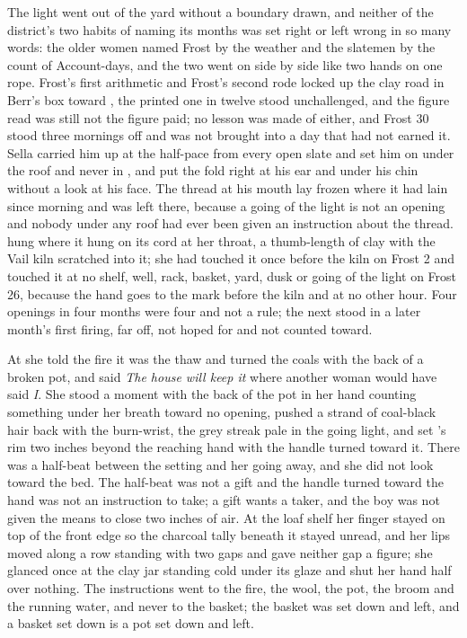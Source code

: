 The light went out of the yard without a boundary drawn, and neither of the district's two habits of naming its months was set right or left wrong in so many words: the older women named Frost by the weather and the slatemen by the count of Account-days, and the two went on side by side like two hands on one rope. Frost's first arithmetic and Frost's second rode locked up the clay road in Berr's box toward , the printed one in twelve stood unchallenged, and the figure read was still not the figure paid; no lesson was made of either, and Frost 30 stood three mornings off and was not brought into a day that had not earned it. Sella carried him up at the half-pace from every open slate and set him on  under the roof and never in , and put the fold right at his ear and under his chin without a look at his face. The thread at his mouth lay frozen where it had lain since morning and was left there, because a going of the light is not an opening and nobody under any roof had ever been given an instruction about the thread.  hung where it hung on its cord at her throat, a thumb-length of  clay with the Vail kiln scratched into it; she had touched it once before the kiln on Frost 2 and touched it at no shelf, well, rack, basket, yard, dusk or going of the light on Frost 26, because the hand goes to the mark before the kiln and at no other hour. Four openings in four months were four and not a rule; the next stood in a later month's first firing, far off, not hoped for and not counted toward.

At  she told the fire it was the thaw and turned the coals with the back of a broken pot, and said \emph{The house will keep it} where another woman would have said \emph{I}. She stood a moment with the back of the pot in her hand counting something under her breath toward no opening, pushed a strand of coal-black hair back with the burn-wrist, the grey streak pale in the going light, and set 's rim two inches beyond the reaching hand with the handle turned toward it. There was a half-beat between the setting and her going away, and she did not look toward the bed. The half-beat was not a gift and the handle turned toward the hand was not an instruction to take; a gift wants a taker, and the boy was not given the means to close two inches of air. At the loaf shelf her finger stayed on top of the front edge so the charcoal tally beneath it stayed unread, and her lips moved along a row standing with two gaps and gave neither gap a figure; she glanced once at the clay jar standing cold under its glaze and shut her hand half over nothing. The instructions went to the fire, the wool, the pot, the broom and the running water, and never to the basket; the basket was set down and left, and a basket set down is a pot set down and left.


